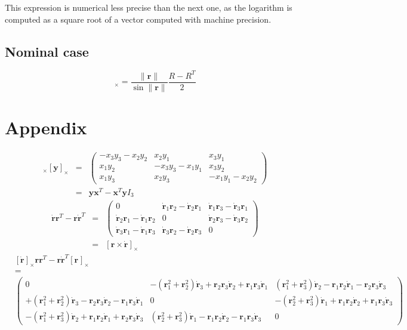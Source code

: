 \documentclass {article}
\newcommand\rot{\mathbf{r}}
\newcommand\x{\mathbf{x}}
\newcommand\y{\mathbf{y}}
\newcommand\rcross[1]{[\rot_{#1}]_{\times}}
\newcommand\xcross{[\mathbf{x}]_{\times}}
\newcommand\ycross{[\mathbf{y}]_{\times}}
\newcommand\rdotcross{\left[\dot{\rot}\right]_{\times}}
\newcommand\normr{\|\rot\|}
\begin{document}
This expression is numerical less precise than the next one, as the logarithm is computed as a square root of
a vector computed with machine precision.

\subsection{Nominal case}

\begin{equation}
\rcross{} = \frac{\normr}{\sin \normr} \frac{R - R^T}{2}
\end{equation}

\section{Appendix}

\begin{eqnarray}
\xcross \ycross &=&
\left(\begin{array}{ccc}
-x_3y_3 - x_2y_2 & x_2y_1 & x_3y_1\\
x_1y_2 & -x_3y_3-x_1y_1 & x_3y_2 \\
x_1y_3 & x_2y_3 & -x_1y_1 - x_2y_2
\end{array}\right)\\
\label{eq:xcrossycross}
&=& \y\x^T-\x^T\y I_3
\end{eqnarray}
\begin{eqnarray}
\dot{\rot}\rot^T-\rot\dot{\rot}^T &=&
\left(\begin{array}{ccc}
0 & \dot{\rot}_1\rot_2 - \dot{\rot}_2\rot_1 & \dot{\rot}_1\rot_3 - \dot{\rot}_3\rot_1\\
\dot{\rot}_2\rot_1 - \dot{\rot}_1\rot_2 & 0 & \dot{\rot}_2\rot_3 - \dot{\rot}_3\rot_2\\
\dot{\rot}_3\rot_1 - \dot{\rot}_1\rot_3 & \dot{\rot}_3\rot_2 - \dot{\rot}_2\rot_3 & 0\end{array}\right)\\
\label{eq:dotrrT-rdotrT}
&=& \left[\rot\times\dot{\rot}\right]_{\times}
\end{eqnarray}
{\tiny
\begin{eqnarray*}
&\rdotcross\rot\rot^T-\rot\dot{\rot}^T\rcross{}&\\
&=&\\
&\left(\begin{array}{ccc}
0&-(\rot_1^2+\rot_2^2)\dot{\rot}_3+\rot_2\rot_3\dot{\rot}_2+\rot_1\rot_3\dot{\rot}_1 & (\rot_1^2+\rot_3^2)\dot{\rot}_2-\rot_1\rot_2\dot{\rot}_1-\rot_2\rot_3\dot{\rot}_3\\
+(\rot_1^2+\rot_2^2)\dot{\rot}_3-\rot_2\rot_3\dot{\rot}_2-\rot_1\rot_3\dot{\rot}_1 & 0 & -(\rot_2^2+\rot_3^2)\dot{\rot}_1+\rot_1\rot_2\dot{\rot}_2+\rot_1\rot_3\dot{\rot}_3\\
-(\rot_1^2+\rot_3^2)\dot{\rot}_2+\rot_1\rot_2\dot{\rot}_1+\rot_2\rot_3\dot{\rot}_3 & (\rot_2^2+\rot_3^2)\dot{\rot}_1-\rot_1\rot_2\dot{\rot}_2-\rot_1\rot_3\dot{\rot}_3 & 0
\end{array}\right)&
\end{eqnarray*}
}
\end{document}
